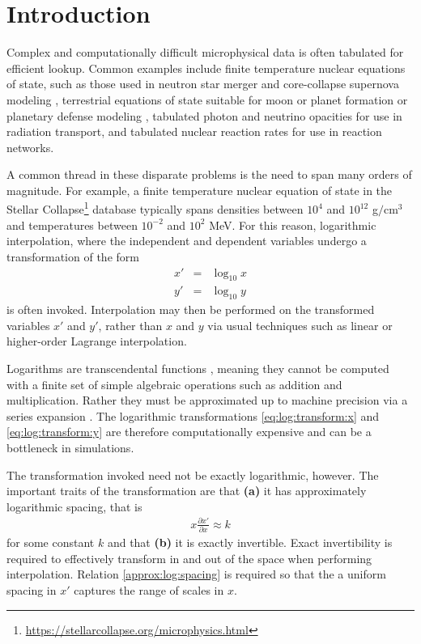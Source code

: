 \documentclass[linenumbers,twocolumn]{aastex631}
\begin{document}
\section{Introduction} \label{sec:intro}

Complex and computationally difficult microphysical data is often tabulated for efficient lookup. Common examples include finite temperature nuclear equations of state, such as those used in neutron star merger and core-collapse supernova modeling \citep{stellarcollapsetables}, terrestrial equations of state suitable for moon or planet formation or planetary defense modeling \citep{sesame}, tabulated photon \citep{Rogers92Opal,Iglesias96Opal,Zhu21DustOpacity,Mills24GRRMHDBH} and neutrino opacities \citep{BurrowsNeutrinos,OConnorNuLib,fornax} for use in radiation transport, and tabulated nuclear reaction rates \citep{REACLIB} for use in reaction networks.

A common thread in these disparate problems is the need to span many orders of magnitude. For example, a finite temperature nuclear equation of state in the Stellar Collapse\footnote{\url{https://stellarcollapse.org/microphysics.html}} database typically spans densities between $10^4$ and $10^{12}$ g$/$cm$^3$ and temperatures between $10^{-2}$ and $10^{2}$ MeV. For this reason, logarithmic interpolation, where the independent and dependent variables undergo a transformation of the form
\begin{eqnarray}
    \label{eq:log:transform:x}
    x' &=& \log_{10}x\\
    \label{eq:log:transform:y}
    y' &=& \log_{10}y
\end{eqnarray}
is often invoked. Interpolation may then be performed on the transformed variables $x'$ and $y'$, rather than $x$ and $y$ via usual techniques such as linear or higher-order Lagrange interpolation.

Logarithms are transcendental functions \citep{townsend1915functions}, meaning they cannot be computed with a finite set of simple algebraic operations such as addition and multiplication. Rather they must be approximated up to machine precision via a series expansion \citep{cody1980software}. The logarithmic transformations \eqref{eq:log:transform:x} and \eqref{eq:log:transform:y} are therefore computationally expensive and can be a bottleneck in simulations.

The transformation invoked need not be exactly logarithmic, however. The important traits of the transformation are that \textbf{(a)} it has approximately logarithmic spacing, that is
\begin{eqnarray}
    \label{approx:log:spacing}
    x\frac{\partial x'}{\partial x} \approx k
\end{eqnarray}
for some constant $k$ and that \textbf{(b)} it is exactly invertible. Exact invertibility is required to effectively transform in and out of the space when performing interpolation. Relation \eqref{approx:log:spacing} is required so that the a uniform spacing in $x'$ captures the range of scales in $x$. 
\end{document}
